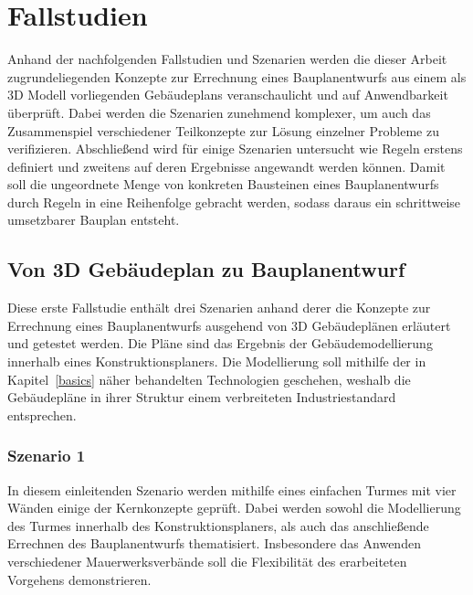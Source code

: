 \chapter{Fallstudien}\label{scenarios}
Anhand der nachfolgenden Fallstudien und Szenarien werden die dieser Arbeit zugrundeliegenden Konzepte zur Errechnung eines Bauplanentwurfs aus einem als 3D Modell vorliegenden Gebäudeplans veranschaulicht und auf Anwendbarkeit überprüft.
Dabei werden die Szenarien zunehmend komplexer, um auch das Zusammenspiel verschiedener Teilkonzepte zur Lösung einzelner Probleme zu verifizieren.
Abschließend wird für einige Szenarien untersucht wie Regeln erstens definiert und zweitens auf deren Ergebnisse angewandt werden können.
Damit soll die ungeordnete Menge von konkreten Bausteinen eines Bauplanentwurfs durch Regeln in eine Reihenfolge gebracht werden, sodass daraus ein schrittweise umsetzbarer Bauplan entsteht.

\section{Von 3D Gebäudeplan zu Bauplanentwurf}
Diese erste Fallstudie enthält drei Szenarien anhand derer die Konzepte zur Errechnung eines Bauplanentwurfs ausgehend von 3D Gebäudeplänen erläutert und getestet werden.
Die Pläne sind das Ergebnis der Gebäudemodellierung innerhalb eines Konstruktionsplaners.
Die Modellierung soll mithilfe der in Kapitel~\ref{basics} näher behandelten Technologien geschehen, weshalb die Gebäudepläne in ihrer Struktur einem verbreiteten Industriestandard entsprechen.

\subsection{Szenario 1}\label{scenarios:scenario1}
In diesem einleitenden Szenario werden mithilfe eines einfachen Turmes mit vier Wänden einige der Kernkonzepte geprüft.
Dabei werden sowohl die Modellierung des Turmes innerhalb des Konstruktionsplaners, als auch das anschließende Errechnen des Bauplanentwurfs thematisiert.
Insbesondere das Anwenden verschiedener Mauerwerksverbände soll die Flexibilität des erarbeiteten Vorgehens demonstrieren.

